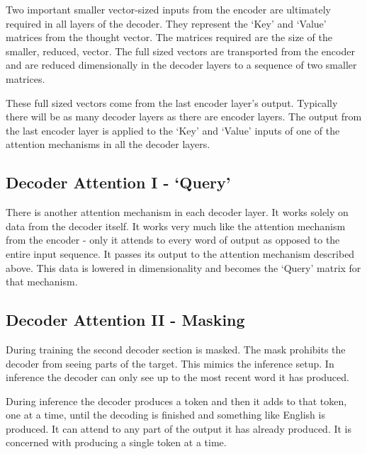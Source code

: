 Two important smaller vector-sized inputs from the encoder are ultimately required in all layers of the decoder. They represent the `Key' and `Value' matrices from the thought vector. The matrices required are the size of the smaller, reduced, vector. The full sized vectors are transported from the encoder and are reduced dimensionally in the decoder layers to a sequence of two smaller matrices. 

These full sized vectors come from the last encoder layer's output. Typically there will be as many decoder layers as there are encoder layers. The output from the last encoder layer is applied to the `Key' and `Value' inputs of one of the attention mechanisms in all the decoder layers.

\subsection{Decoder Attention I - `Query'}
There is another attention mechanism in each decoder layer. It works solely on data from the decoder itself. It works very much like the attention mechanism from the encoder - only it attends to every word of output as opposed to the entire input sequence. It passes its output to the attention mechanism described above. This data is lowered in dimensionality and becomes the `Query' matrix for that mechanism. 

\subsection{Decoder Attention II - Masking}

During training the second decoder section is masked. The mask prohibits the decoder from seeing parts of the target. This mimics the inference setup. In inference the decoder can only see up to the most recent word it has produced.

During inference the decoder produces a token and then it adds to that token, one at a time, until the decoding is finished and something like English is produced. It can attend to any part of the output it has already produced. It is concerned with producing a single token at a time.

